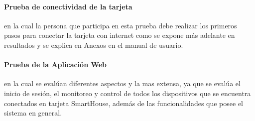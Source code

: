 \paragraph{Prueba de conectividad de la tarjeta} en la cual la persona que participa en esta prueba debe realizar los primeros pasos para conectar la tarjeta con internet como se expone más adelante en resultados y se explica en Anexos en el manual de usuario.\\

\paragraph{Prueba de la Aplicación Web} en la cual se evalúan diferentes aspectos y la mas extensa, ya que se evalúa el inicio de sesión, el monitoreo y control de todos los dispositivos que se encuentra conectados en tarjeta SmartHouse, además de las funcionalidades que posee el sistema en general.\\
